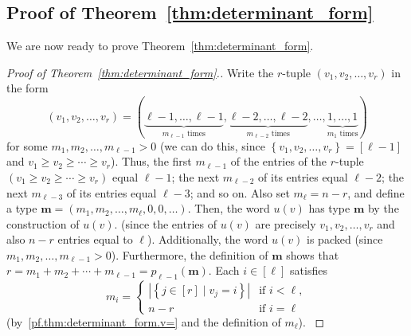\documentclass[reqno]{amsart}
\newcommand{\0}{\phantom{c}}
\newcommand{\mm}{\mathbf{m}}
\newenvironment{verlong}{}{}
\newenvironment{vershort}{}{}
\newcommand{\set}[1]{\left\{ #1 \right\}}
\newcommand{\abs}[1]{\left| #1 \right|}
\newcommand{\tup}[1]{\left( #1 \right)}
\newcommand{\ive}[1]{\left[ #1 \right]}
\theoremstyle{plain}
\theoremstyle{definition}
\numberwithin{equation}{section}
\begin{document}
\subsection{Proof of Theorem~\ref{thm:determinant_form}}

We are now ready to prove Theorem~\ref{thm:determinant_form}.

\begin{proof}[Proof of Theorem~\ref{thm:determinant_form}.]
Write the $r$-tuple $\tup{v_1, v_2, \dotsc, v_r}$ in the form
\begin{equation}
\label{pf.thm:determinant_form.v=}
\tup{v_1, v_2, \dotsc, v_r} = (
  \underbrace{\ell-1,\ldots,\ell-1}_{m_{\ell-1}\text{ times}},
  \underbrace{\ell-2,\ldots,\ell-2}_{m_{\ell-2}\text{ times}},
  \dotsc,
  \underbrace{1,\ldots,1}_{m_1\text{ times}}
)
\end{equation}
for some $m_1, m_2, \ldots, m_{\ell-1} > 0$
(we can do this, since $\set{v_1, v_2, \dotsc, v_r} = \ive{\ell-1}$ and $v_1 \geq v_2 \geq \cdots \geq v_r$).
\begin{verlong}
Thus, the first $m_{\ell-1}$ of the entries of the $r$-tuple $\tup{v_1 \geq v_2 \geq \cdots \geq v_r}$ equal $\ell-1$; the next $m_{\ell-2}$ of its entries equal $\ell-2$; the next $m_{\ell-3}$ of its entries equal $\ell-3$; and so on.
\end{verlong}
Also set $m_{\ell} = n - r$, and define a type $\mm = \tup{m_1, m_2, \dotsc, m_{\ell}, 0, 0, \ldots}$.
Then, the word $u(v)$ has type $\mm$
\begin{vershort}
by the construction of $u(v)$.
\end{vershort}
\begin{verlong}
(since the entries of $u(v)$ are precisely $v_1, v_2, \dotsc, v_r$ and also $n-r$ entries equal to $\ell$).
\end{verlong}
Additionally, the word $u(v)$ is packed (since $m_1, m_2, \ldots, m_{\ell-1} > 0$).
Furthermore, the definition of $\mm$ shows that $r = m_1 + m_2 + \cdots + m_{\ell-1} = p_{\ell-1}(\mm)$.
\begin{verlong}
Each $i \in \ive{\ell}$ satisfies
\[
m_i =
  \begin{cases}
  \abs{ \set{ j \in \ive{r} \mid v_j = i}} & \text{if } i < \ell,\\
  n - r & \text{if } i = \ell
  \end{cases}
\]
(by~\eqref{pf.thm:determinant_form.v=} and the definition of $m_{\ell}$).
\end{verlong}


\end{proof}
\end{document}
